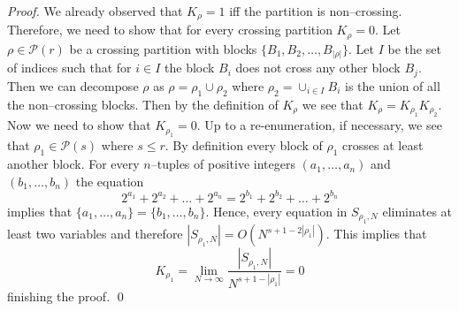 \documentclass[smallextended]{svjour3}
\begin{document}
\begin{proof}
We already observed that $K_{\rho}=1$ iff the partition is non--crossing. Therefore, we need to show that for every crossing partition $K_{\rho}=0$. Let $\rho\in\mathcal{P}(r)$ be a crossing partition 
with blocks $\{B_1,B_2,\ldots,B_{|\rho|}\}$. Let $I$ be the set of indices such that for $i\in I$ the block $B_{i}$ does not cross any other block $B_{j}$. Then we can decompose $\rho$ as $\rho = \rho_1\cup \rho_{2}$ where $\rho_{2}=\cup_{i\in I}{B_{i}}$ is the union of all the non--crossing blocks. Then by the definition of $K_{\rho}$ we see that $K_{\rho}=K_{\rho_1}K_{\rho_2}$. Now we need to show that $K_{\rho_1}=0$. Up to a re-enumeration, if necessary, we see that $\rho_1\in\mathcal{P}(s)$ where $s\leq r$. By definition every block of $\rho_1$ crosses at least another block. For every $n$--tuples of positive integers $(a_1,\ldots,a_n)$ and $(b_1,\ldots,b_n)$ the equation
$$
2^{a_1}+2^{a_2}+\ldots+2^{a_n}=2^{b_1}+2^{b_2}+\ldots+2^{b_n}
$$
implies that $\{a_1,\ldots,a_n\}=\{b_1,\ldots,b_n\}$. Hence, every equation in $S_{\rho_1,N}$ eliminates at least two variables and therefore $|S_{\rho_1,N}|=O(N^{s+1-2|\rho_1|})$. This implies that
$$
K_{\rho_1}=\lim_{N\to\infty}\frac{|S_{\rho_1,N}|}{N^{s+1-|\rho_1|}}=0
$$ 
finishing the proof.
\qed \end{proof}
\end{document}
